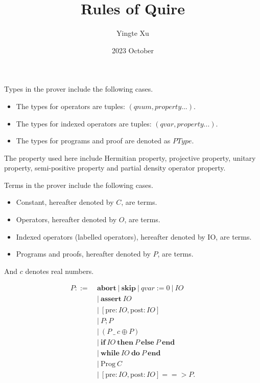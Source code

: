\documentclass{article}
\title{\textbf{Rules of Quire}}
\author{Yingte Xu}
\date{2023 October}
\begin{document}
\maketitle

Types in the prover include the following cases.
\begin{itemize}
    \item The types for operators are tuples: $(qnum, property...)$.
    \item The types for indexed operators are tuples: $(qvar, property...)$.
    \item The types for programs and proof are denoted as $PType$.
\end{itemize}
The property used here include Hermitian property, projective property, unitary property, semi-positive property and partial density operator property.

\vspace{1em}

Terms in the prover include the following cases.
\begin{itemize}
    \item Constant, hereafter denoted by $C$, are terms.
    \item Operators, hereafter denoted by $O$, are terms.
    \item Indexed operators (labelled operators), hereafter denoted by IO, are terms.
    \item Programs and proofs, hereafter denoted by $P$, are terms.
\end{itemize}

And $c$ denotes real numbers.


$$
\begin{aligned}
    P ::=\ & \mathbf{abort}\ |\ \mathbf{skip}\ |\ qvar :=0\ |\ IO\ \\
        & |\ \mathbf{assert}\ IO\ \\
        & |\ [\mathrm{pre} : IO, \mathrm{post} : IO] \\
        & |\ P; P \\
        & |\ ( P\ \_\ c \oplus P ) \\
        & |\ \mathbf{if}\ IO\ \mathbf{then}\ P\ \mathbf{else}\ P\ \mathbf{end}\\
        & |\ \mathbf{while}\ IO\ \mathbf{do}\ P\ \mathbf{end}\\
        & |\ \mathrm{Prog}\ C\\
        & |\ [\mathrm{pre} : IO, \mathrm{post} : IO] ==> P.
\end{aligned}
$$
\end{document}
